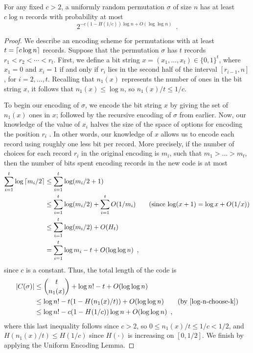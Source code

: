 \documentclass{patmorin}
\begin{document}
\begin{thm}
  For any fixed $c > 2$, 
  a uniformly random permutation $\sigma$ of size $n$ has at least $c
  \log n$ records with probability at most
  \[
    2^{-c (1 - H(1/c)) \log n + O(\log \log n)}\enspace .
  \]
\end{thm}
\begin{proof}
We describe an encoding scheme for permutations with at least 
$t = {\lceil c \log n \rceil}$ records. 
Suppose that the permutation $\sigma$ has $t$ records
$r_1 < r_2 < \cdots < r_t$. First, we define a
bit string $x = (x_1, \dots, x_t) \in \{0, 1\}^t$, where $x_1 = 0$
and $x_i = 1$ if and only if $r_i$ lies in the second half of the
interval $[r_{i - 1}, n]$, for $i = 2, \dots, t$. 
Recalling that  $n_1(x)$ represents the 
number of ones in the bit string $x$, it follows that 
$n_1(x) \leq \log n$, so $n_1(x)/t \leq 1/c$.

To begin our encoding of $\sigma$, we encode the bit string $x$ by
giving the set of $n_1(x)$ ones in $x$; followed by the 
recursive encoding of $\sigma$ from earlier. Now, our knowledge of
the value of $x_i$ halves the size of the space of options for
encoding the position $r_i$ . In other words, our knowledge of $x$
allows us to encode each record using roughly one less bit per
record. More precisely, if the number of choices for each record
$r_i$ in the original encoding is $m_i$, such that $m_1 > \dots >
  m_t$, then the number of bits spent encoding records in the new code
  is at most
  \begin{align*}
    \sum_{i = 1}^t \log {\lceil m_i/2 \rceil} &\leq \sum_{i = 1}^t \log (m_i/2
                                       + 1)
    \\
                                     &\leq \sum_{i = 1}^t \log (m_i/2) + \sum_{i = 1}^t O(1/m_i) \tag{since $\log (x + 1) = \log x + O(1/x)$} \\
                                     &\leq \sum_{i = 1}^t \log (m_i/2) + O(H_t) \\
                                     &= \sum_{i = 1}^t \log
                                       m_i - t + O(\log \log n) \enspace ,
  \end{align*}
  since $c$ is a constant. Thus, the total length of the code is
  \begin{align*}
    |C(\sigma)| &\leq \binom{t}{n_1(x)} + \log n! - t + O(\log \log n) \\
                &\leq \log n! - t (1 - H(n_1(x)/t)) + O(\log \log n) \tag{by \eqref{log-n-choose-k}}\\
                &\leq \log n! - c (1 - H(1/c))\log n + O(\log \log n) \enspace ,
  \end{align*}
  where this last inequality follows since $c > 2$, so 
  $0 \leq n_1(x)/t \leq 1/c < 1/2$, and $H(n_1(x)/t)
  \leq H(1/c)$ since $H(\cdot)$ is increasing on $[0, 1/2]$. 
  We finish by applying the Uniform Encoding Lemma.
\end{proof}
\end{document}
